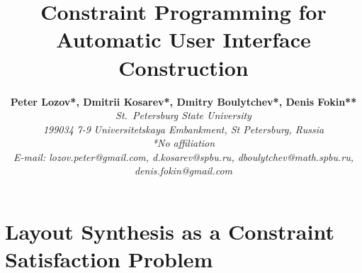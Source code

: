 \documentclass[a4paper,twoside,11pt]{article}
\author{
{\bfseries Peter Lozov*, Dmitrii Kosarev*, Dmitry Boulytchev*, Denis Fokin**}
\\ {\itshape *St.~Petersburg State University}
\\ {\slshape 199034} {\slshape 7-9} {\itshape  Universitetskaya Embankment, St Petersburg, Russia}
\\ {\itshape **No affiliation}
\\ {\itshape E-mail: lozov.peter@gmail.com, d.kosarev@spbu.ru,  dboulytchev@math.spbu.ru, denis.fokin@gmail.com }}
\title{Constraint Programming for Automatic User Interface Construction}
\date{}
\begin{document}
\maketitle
\setcounter{page}{3}
\label{sec:intro}


\label{sec:scene}


\section{Layout Synthesis as a Constraint Satisfaction Problem}
\label{sec:guidelines}


\label{sec:rel}


\label{sec:synthesizing}


\label{sec:impl}


\label{sec:related}


\label{sec:conclusion}

 



\begin{thebibliography}{99}
	\small
	
\end{thebibliography}

\newpage


\label{lastpage}
\end{document}
